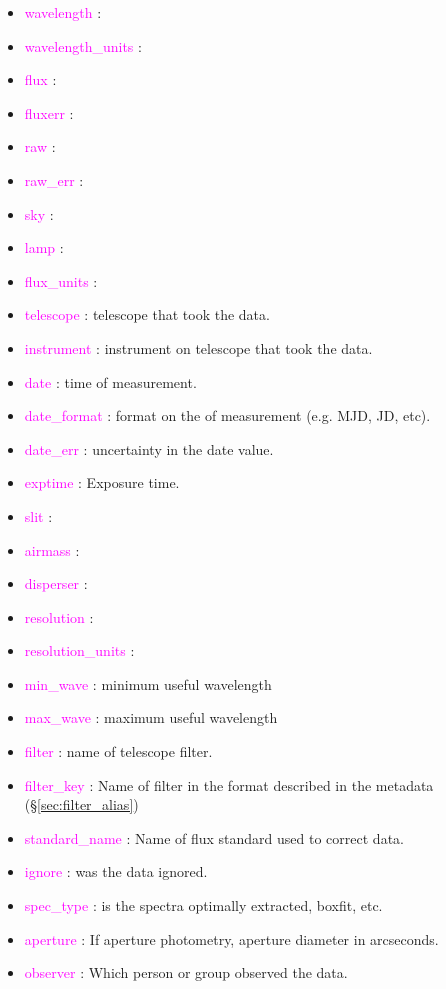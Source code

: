 \documentclass[tighten]{aastex631}
\newcommand{\keyword}[1]{\textcolor{magenta}{#1}}
\begin{document}
\begin{itemize}
    \item \keyword{wavelength} : 
    \item \keyword{wavelength\_units} : 
    \item \keyword{flux} : 
    \item \keyword{fluxerr} : 
    \item \keyword{raw} : 
    \item \keyword{raw\_err} : 
    \item \keyword{sky} : 
    \item \keyword{lamp} : 
    \item \keyword{flux\_units} : 
    \item \keyword{telescope} : telescope that took the data.
    \item \keyword{instrument} : instrument on telescope that took the data.
    \item \keyword{date} : time of measurement.
    \item \keyword{date\_format} : format on the of measurement (e.g. MJD, JD, etc).
    \item \keyword{date\_err} : uncertainty in the date value.
    \item \keyword{exptime} : Exposure time.
    \item \keyword{slit} : 
    \item \keyword{airmass} : 
    \item \keyword{disperser} : 
    \item \keyword{resolution} : 
    \item \keyword{resolution\_units} : 
    \item \keyword{min\_wave} : minimum useful wavelength
    \item \keyword{max\_wave} : maximum useful wavelength
    \item \keyword{filter} : name of telescope filter.
    \item \keyword{filter\_key} : Name of filter in the format described in the metadata (\S\ref{sec:filter_alias})
    \item \keyword{standard\_name} : Name of flux standard used to correct data.
    \item \keyword{ignore} : was the data ignored.
    \item \keyword{spec\_type} : is the spectra optimally extracted, boxfit, etc.
    \item \keyword{aperture} : If aperture photometry, aperture diameter in arcseconds.
    \item \keyword{observer} : Which person or group observed the data.

\end{itemize}
\end{document}
